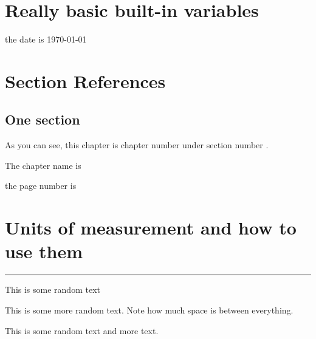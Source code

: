 \documentclass[12pt]{report}
\begin{document}
\chapter{Really basic built-in variables}
the date is \today 


\chapter{Section References}
\section{One section}

As you can see, this chapter is chapter number \thechapter under section number \thesection. %

The chapter name is \chaptername 

the page number is \thepage 

\pagebreak 
\chapter{Units of measurement and how to use them}

\rule[0pt]{5cm}{2mm} %

This is some random text 

\vspace{2cm}

This is some more random text. Note how much space is between everything. 

\vspace{3cm}
This is some random text \hspace{2cm} and more text.
\end{document}
